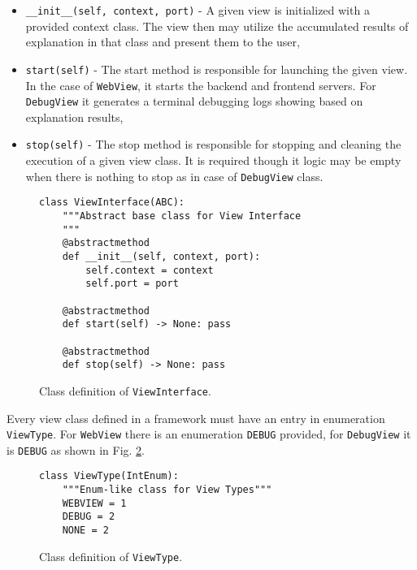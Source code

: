 \documentclass[
    bindingoffset=5mm,  %
    footnoteindent=3mm, %
    hyphenation=true    %
]{src/wut-thesis}
\begin{document}
\begin{itemize}
    \item \texttt{__init__(self, context, port)} - A given view is initialized with a provided context class.
    The view then may utilize the accumulated results of explanation in that class and present them to the user,

    \item \texttt{start(self)} - The start method is responsible for launching the given view. In the case of \texttt{WebView},
    it starts the backend and frontend servers. For \texttt{DebugView} it generates a terminal debugging logs showing based on 
    explanation results,
    
    \item \texttt{stop(self)} - The stop method is responsible for stopping and cleaning the execution of a given view class. It is required though it logic may be empty when there is nothing to stop as in case of \texttt{DebugView} class.
\end{itemize}

\begin{figure}%
\begin{verbatim}
class ViewInterface(ABC):
    """Abstract base class for View Interface
    """
    @abstractmethod
    def __init__(self, context, port):
        self.context = context
        self.port = port

    @abstractmethod
    def start(self) -> None: pass

    @abstractmethod
    def stop(self) -> None: pass    
\end{verbatim}
\caption{Class definition of \texttt{ViewInterface}.}
\label{fig:ViewInterface}
\end{figure}

Every view class defined in a framework must have an entry in enumeration \texttt{ViewType}.
For \texttt{WebView} there is an enumeration \texttt{DEBUG} provided, for \texttt{DebugView}
it is \texttt{DEBUG} as shown in Fig. \ref{fig:ViewType}.

\begin{figure}%
\begin{verbatim}
class ViewType(IntEnum):
    """Enum-like class for View Types"""
    WEBVIEW = 1
    DEBUG = 2
    NONE = 2
\end{verbatim}
\caption{Class definition of \texttt{ViewType}.}
\label{fig:ViewType}
\end{figure}
\end{document}
